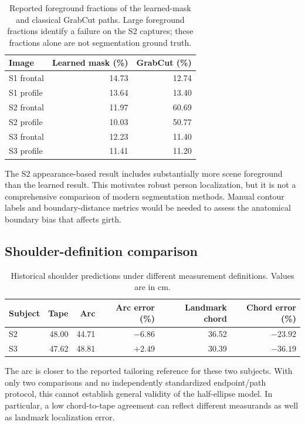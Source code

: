 \begin{table}[htbp]
\centering\small
\caption{Reported foreground fractions of the learned-mask and classical GrabCut paths. Large foreground fractions identify a failure on the S2 captures; these fractions alone are not segmentation ground truth.}
\label{tab:segmentation_comparison}
\begin{tabular}{lrr}
\toprule
Image & Learned mask (\%) & GrabCut (\%) \\
\midrule
S1 frontal & 14.73 & 12.74 \\
S1 profile & 13.64 & 13.40 \\
S2 frontal & 11.97 & 60.69 \\
S2 profile & 10.03 & 50.77 \\
S3 frontal & 12.23 & 11.40 \\
S3 profile & 11.41 & 11.20 \\
\bottomrule
\end{tabular}
\end{table}
The S2 appearance-based result includes substantially more scene foreground than the learned result. This motivates robust person localization, but it is not a comprehensive comparison of modern segmentation methods. Manual contour labels and boundary-distance metrics would be needed to assess the anatomical boundary bias that affects girth.

\subsection{Shoulder-definition comparison}
\begin{table}[htbp]
\centering\small
\caption{Historical shoulder predictions under different measurement definitions. Values are in cm.}
\label{tab:shoulder_comparison}
\begin{tabular}{lrrrrr}
\toprule
Subject & Tape & Arc & Arc error (\%) & Landmark chord & Chord error (\%) \\
\midrule
S2 & 48.00 & 44.71 & $-6.86$ & 36.52 & $-23.92$ \\
S3 & 47.62 & 48.81 & $+2.49$ & 30.39 & $-36.19$ \\
\bottomrule
\end{tabular}
\end{table}
The arc is closer to the reported tailoring reference for these two subjects. With only two comparisons and no independently standardized endpoint/path protocol, this cannot establish general validity of the half-ellipse model. In particular, a low chord-to-tape agreement can reflect different measurands as well as landmark localization error.

